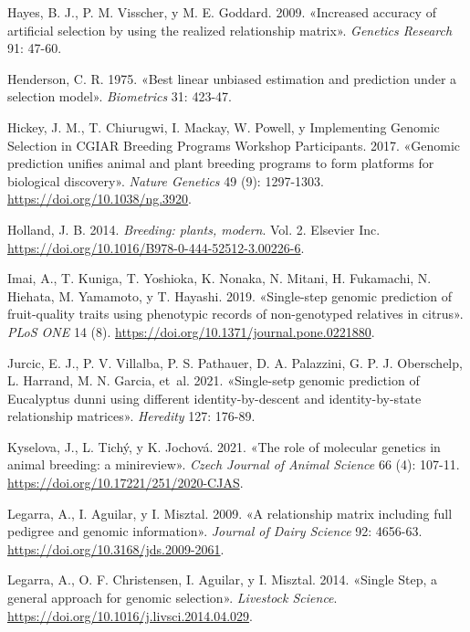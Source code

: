 \documentclass[11pt,spanish,a4paper,oneside,]{book} %
\begin{document}
\leavevmode\hypertarget{ref-cite:13}{}%
Hayes, B. J., P. M. Visscher, y M. E. Goddard. 2009. «Increased accuracy of artificial selection by using the realized relationship matrix». \emph{Genetics Research} 91: 47-60.

\leavevmode\hypertarget{ref-cite:41}{}%
Henderson, C. R. 1975. «Best linear unbiased estimation and prediction under a selection model». \emph{Biometrics} 31: 423-47.

\leavevmode\hypertarget{ref-cite:44}{}%
Hickey, J. M., T. Chiurugwi, I. Mackay, W. Powell, y Implementing Genomic Selection in CGIAR Breeding Programs Workshop Participants. 2017. «Genomic prediction unifies animal and plant breeding programs to form platforms for biological discovery». \emph{Nature Genetics} 49 (9): 1297-1303. \url{https://doi.org/10.1038/ng.3920}.

\leavevmode\hypertarget{ref-cite:43}{}%
Holland, J. B. 2014. \emph{Breeding: plants, modern}. Vol. 2. Elsevier Inc. \url{https://doi.org/10.1016/B978-0-444-52512-3.00226-6}.

\leavevmode\hypertarget{ref-cite:20}{}%
Imai, A., T. Kuniga, T. Yoshioka, K. Nonaka, N. Mitani, H. Fukamachi, N. Hiehata, M. Yamamoto, y T. Hayashi. 2019. «Single-step genomic prediction of fruit-quality traits using phenotypic records of non-genotyped relatives in citrus». \emph{PLoS ONE} 14 (8). \url{https://doi.org/10.1371/journal.pone.0221880}.

\leavevmode\hypertarget{ref-cite:11}{}%
Jurcic, E. J., P. V. Villalba, P. S. Pathauer, D. A. Palazzini, G. P. J. Oberschelp, L. Harrand, M. N. Garcia, et~al. 2021. «Single-setp genomic prediction of Eucalyptus dunni using different identity-by-descent and identity-by-state relationship matrices». \emph{Heredity} 127: 176-89.

\leavevmode\hypertarget{ref-cite:32}{}%
Kyselova, J., L. Tichý, y K. Jochová. 2021. «The role of molecular genetics in animal breeding: a minireview». \emph{Czech Journal of Animal Science} 66 (4): 107-11. \url{https://doi.org/10.17221/251/2020-CJAS}.

\leavevmode\hypertarget{ref-cite:17}{}%
Legarra, A., I. Aguilar, y I. Misztal. 2009. «A relationship matrix including full pedigree and genomic information». \emph{Journal of Dairy Science} 92: 4656-63. \url{https://doi.org/10.3168/jds.2009-2061}.

\leavevmode\hypertarget{ref-cite:15}{}%
Legarra, A., O. F. Christensen, I. Aguilar, y I. Misztal. 2014. «Single Step, a general approach for genomic selection». \emph{Livestock Science}. \url{https://doi.org/10.1016/j.livsci.2014.04.029}.
\end{document}
